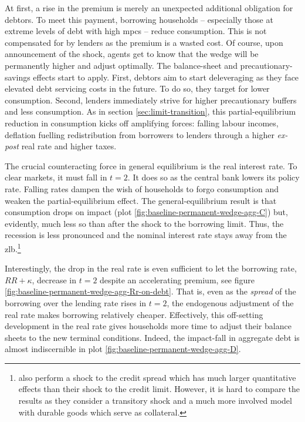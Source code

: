 \documentclass[a4paper,12pt]{article} %
\numberwithin{equation}{section} %
\numberwithin{figure}{section}
\numberwithin{table}{section}
\begin{document}
At first, a rise in the premium is merely an unexpected additional obligation for debtors. To meet this payment, borrowing households -- especially those at extreme levels of debt with high \Gls{mpc}s -- reduce consumption. This is not compensated for by lenders as the premium is a wasted cost. Of course, upon announcement of the shock, agents get to know that the wedge will be permanently higher and adjust optimally. The balance-sheet and precautionary-savings effects start to apply. First, debtors aim to start deleveraging as they face elevated debt servicing costs in the future. To do so, they target for lower consumption. Second, lenders immediately strive for higher precautionary buffers and less consumption. As in section \ref{sec:limit-transition}, this partial-equilibrium reduction in consumption kicks off amplifying forces: falling labour incomes, deflation fuelling redistribution from borrowers to lenders through a higher \textit{ex-post} real rate and higher taxes. 

The crucial counteracting force in general equilibrium is the real interest rate. To clear markets, it must fall in $t=2$. It does so as the central bank lowers its policy rate. Falling rates dampen the wish of households to forgo consumption and weaken the partial-equilibrium effect. The general-equilibrium result is that consumption drops on impact (plot \ref{fig:baseline-permanent-wedge-agg-C}) but, evidently, much less so than after the shock to the borrowing limit. Thus, the recession is less pronounced and the nominal interest rate stays away from the \Gls{zlb}.\footnote{\textcite{gl2017} also perform a shock to the credit spread which has much larger quantitative effects than their shock to the credit limit. However, it is hard to compare the results as they consider a transitory shock and a much more involved model with durable goods which serve as collateral.} 

Interestingly, the drop in the real rate is even sufficient to let the borrowing rate, $RR + \kappa$, decrease in $t=2$ despite an accelerating premium, see figure \ref{fig:baseline-permanent-wedge-agg-Rr-on-debt}. That is, even as the \textit{spread} of the borrowing over the lending rate rises in $t=2$, the endogenous adjustment of the real rate makes borrowing relatively cheaper. Effectively, this off-setting development in the real rate gives households more time to adjust their balance sheets to the new terminal conditions. Indeed, the impact-fall in aggregate debt is almost indiscernible in plot \ref{fig:baseline-permanent-wedge-agg-D}.
\end{document}
